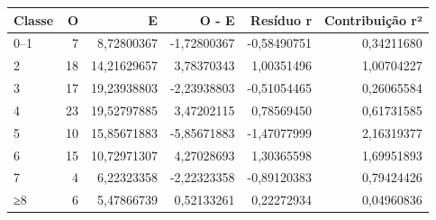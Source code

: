 \begin{tabular}{lrrrrr}
\toprule
Classe & O & E & O - E & Resíduo r & Contribuição r² \\
\midrule
0–1 & 7 & 8,72800367 & -1,72800367 & -0,58490751 & 0,34211680 \\
2 & 18 & 14,21629657 & 3,78370343 & 1,00351496 & 1,00704227 \\
3 & 17 & 19,23938803 & -2,23938803 & -0,51054465 & 0,26065584 \\
4 & 23 & 19,52797885 & 3,47202115 & 0,78569450 & 0,61731585 \\
5 & 10 & 15,85671883 & -5,85671883 & -1,47077999 & 2,16319377 \\
6 & 15 & 10,72971307 & 4,27028693 & 1,30365598 & 1,69951893 \\
7 & 4 & 6,22323358 & -2,22323358 & -0,89120383 & 0,79424426 \\
≥8 & 6 & 5,47866739 & 0,52133261 & 0,22272934 & 0,04960836 \\
\bottomrule
\end{tabular}
